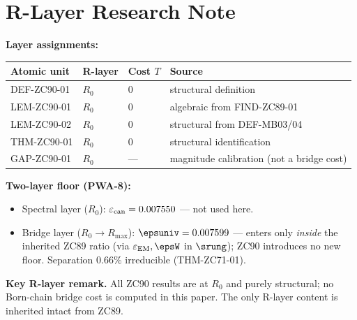 \documentclass[12pt, a4paper]{article}
\renewcommand{\epsEM}{\varepsilon_{\rm EM}}     %
\renewcommand{\epscan}{\varepsilon_{\rm can}}   %
\begin{document}
\section{R-Layer Research Note}
\label{sec:rlayer-zc90}
\begin{layerbox}[title={R-Layer Assignments for ZC90}]

\textbf{Layer assignments:}

{\small\renewcommand{\arraystretch}{1.25}
\begin{center}
\begin{tabular}{@{}llll@{}}
\toprule
Atomic unit & R-layer & Cost $T$ & Source \\
\midrule
DEF-ZC90-01 & $R_0$ & $0$ & structural definition \\
LEM-ZC90-01 & $R_0$ & $0$ & algebraic from FIND-ZC89-01 \\
LEM-ZC90-02 & $R_0$ & $0$ & structural from DEF-MB03/04 \\
THM-ZC90-01 & $R_0$ & $0$ & structural identification \\
GAP-ZC90-01 & $R_0$ & --- & magnitude calibration (not a bridge cost) \\
\bottomrule
\end{tabular}
\end{center}}

\textbf{Two-layer floor (PWA-8):}
\begin{itemize}[leftmargin=2em, noitemsep]
  \item Spectral layer ($R_0$): $\epscan=0.007550$ --- not used here.
  \item Bridge layer ($R_0{\to}R_{\max}$): $\epsuniv=0.007599$ --- enters
    only \emph{inside} the inherited ZC89 ratio (via $\epsEM,\epsW$ in
    $\srung$); ZC90 introduces no new floor. Separation $0.66\%$
    irreducible (THM-ZC71-01).
\end{itemize}

\textbf{Key R-layer remark.} All ZC90 results are at $R_0$ and purely
structural; no Born-chain bridge cost is computed in this paper. The only
R-layer content is inherited intact from ZC89.
\end{layerbox}

\end{document}
